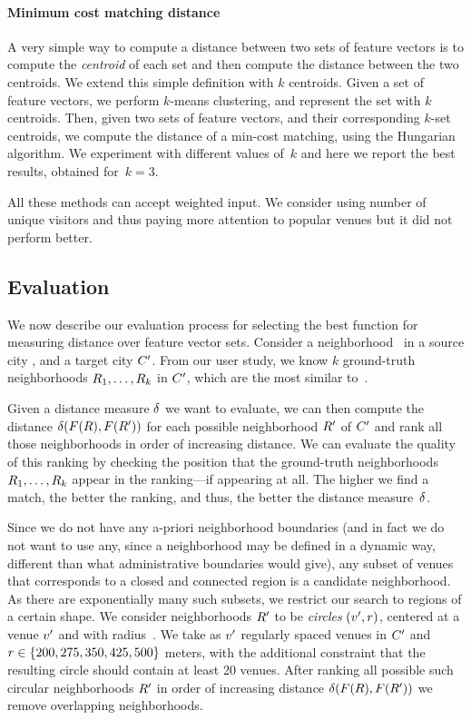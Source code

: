 \paragraph{Minimum cost matching distance}
A very simple way to compute a distance between two sets of feature vectors is
to compute the \emph{centroid} of each set and then compute the distance
between the two centroids.  We extend this simple definition with $k$
centroids.  Given a set of feature vectors, we perform $k$-means clustering,
and represent the set with $k$ centroids.  Then, given two sets of feature
vectors, and their corresponding $k$-set centroids, we compute the distance of
a min-cost matching, using the Hungarian algorithm.  We experiment with
different values of~$k$ and here we report the best results, obtained
for~$k=3$.

\bigskip

All these methods can accept weighted input. We consider using number of unique
visitors and thus paying more attention to popular venues but it did not
perform better.

\subsection{Evaluation}

We now describe our evaluation process for selecting the best function for
measuring distance over feature vector sets. 
Consider a neighborhood \region\ in a source city \city, and a target city
${C}'$.
From our user study, we know $k$ ground-truth neighborhoods
${R}_1,\ldots,{R}_k$ in ${C}'$, which are the most 
similar to~\region.

Given a distance measure ${\delta}$ we want to evaluate, 
we can then compute the distance
${\delta}({F}({R}),{F}({R}'))$ for each possible
neighborhood ${R}'$ of ${C}'$ and rank all those neighborhoods
in order of increasing distance. 
We can evaluate the quality of this ranking by checking the position
that the ground-truth neighborhoods ${R}_1,\ldots,{R}_k$
appear in the ranking---if appearing at all. 
The higher we find a match, the better the ranking, and thus, the
better the distance measure~${\delta}$.

Since we do not have any a-priori neighborhood boundaries (and in fact
we do not want to use any, since a neighborhood may be defined in a
dynamic way, different than what administrative boundaries would give),
any subset of venues that corresponds to a closed and connected region
is a candidate neighborhood. 
As there are exponentially many such subsets, we restrict our
search to regions of a certain shape. 
We consider neighborhoods ${R}'$ to be \emph{circles}
$({v}',{r})$, centered at a venue ${v}'$ and with radius~\radius.
We take as ${v}'$ regularly spaced venues in ${C}'$ and ${r}\in\{200, 275,
350, 425, 500\}$ meters, with the additional constraint that the
resulting circle should contain at least 20 venues. 
After ranking all possible such circular neighborhoods ${R}'$ in
order of increasing distance ${\delta}({F}({R}),{F}({R}'))$
we remove overlapping neighborhoods.

